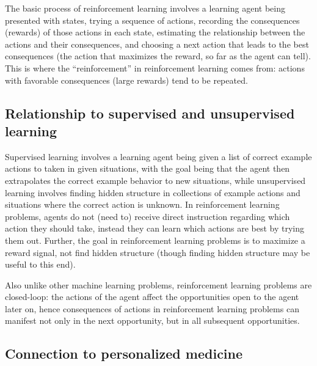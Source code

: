 \documentclass[12pt]{article}
\begin{document}
The basic process of reinforcement learning involves a learning agent being presented with states, trying a sequence of actions, recording the consequences (rewards) of those actions in each state, estimating the relationship between the actions and their consequences, and choosing a next action that leads to the best consequences (the action that maximizes the reward, so far as the agent can tell). This is where the ``reinforcement'' in reinforcement learning comes from: actions with favorable consequences (large rewards) tend to be repeated.


\subsection{Relationship to supervised and unsupervised learning} %
\label{sub:relationship_to_supervise_and_unsupervised_learning}

Supervised learning involves a learning agent being given a list of  correct example actions to taken in given situations, with the goal being that the agent then extrapolates the correct example behavior to new situations, while unsupervised learning involves finding hidden structure in collections of example actions and situations where the correct action is unknown. In reinforcement learning problems, agents do not (need to) receive direct instruction regarding which action they should take, instead they can learn which actions are best by trying them out. Further, the goal in reinforcement learning problems is to maximize a reward signal, not find hidden structure (though finding hidden structure may be useful to this end).

Also unlike other machine learning problems, reinforcement learning problems are closed-loop: the actions of the agent affect the opportunities open to the agent later on, hence consequences of actions in reinforcement learning problems can manifest not only in the next opportunity, but in all subsequent opportunities.


\subsection{Connection to personalized medicine} %
\label{sub:dynamic_treatment_regimes}
\end{document}
